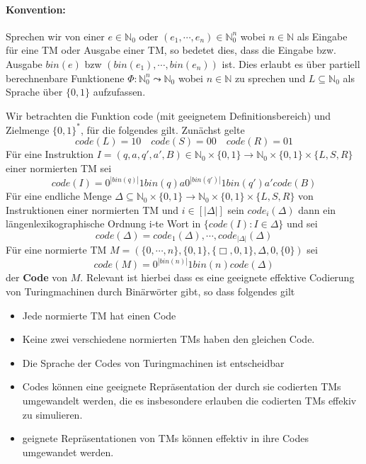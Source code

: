 \paragraph{Konvention: } Sprechen wir von einer \(e \in \mathbb{N}_0\) oder \((e_1, \cdots, e_n) \in \mathbb{N}_0^n\) wobei \(n \in \mathbb{N}\) als Eingabe für eine TM oder Ausgabe einer TM, so bedetet dies, dass die Eingabe bzw. Ausgabe \(bin(e)\) bzw \((bin(e_1), \cdots, bin(e_n))\) ist. Dies erlaubt es über partiell berechnenbare Funktionene \(\Phi: \mathbb{N}_0^n \leadsto \mathbb{N}_0\) wobei \(n\in \mathbb{N}\) zu sprechen und \(L \subseteq \mathbb{N}_0\) als Sprache über \(\{0, 1\}\) aufzufassen.

  Wir betrachten die Funktion code (mit geeignetem Definitionsbereich) und Zielmenge \(\{0, 1\}^*\), für die folgendes gilt. Zunächst gelte 
  \[
    code(L) = 10 \quad code (S) = 00 \quad code(R) = 01
  \]
  Für eine Instruktion \( I = (q, a, q', a', B) \in \mathbb{N}_0 \times \{0, 1\} \to \mathbb{N}_0 \times \{0, 1\} \times \{L, S, R\}\) einer normierten TM sei \[code (I) = 0^{|bin(q)|} 1 bin (q) a 0^{|bin(q')|} 1 bin (q') a' code (B)\] Für eine endliche Menge \( \Delta \subseteq \mathbb{N}_0 \times \{0, 1\} \to \mathbb{N}_0 \times \{0, 1\}\times \{L, S, R\}\) von Instruktionen einer normierten TM und \(i \in [|\Delta|]\) sein \(code_i(\Delta)\) dann ein längenlexikographische Ordnung i-te Wort in \(\{code(I): I \in \Delta\}\) und sei 
  \[
    code (\Delta) = code_1(\Delta), \cdots, code_{|\Delta|}(\Delta)
  \]
  Für eine normierte TM \(M = (\{0, \cdots, n\}, \{0, 1\}, \{\Box, 0, 1\}, \Delta, 0, \{0\})\) sei 
  \[
    code (M) = 0^{|bin(n)|} 1 bin (n) code (\Delta)
  \]
  der \textbf{Code} von \(M\). Relevant ist hierbei dass es eine geeignete effektive Codierung von Turingmachinen durch Binärwörter gibt, so dass folgendes gilt 
  \begin{itemize}
    \item Jede normierte TM hat einen Code 
    \item Keine zwei verschiedene normierten TMs haben den gleichen Code.
    \item Die Sprache der Codes von Turingmachinen ist entscheidbar
    \item Codes können eine geeignete Repräsentation der durch sie codierten TMs umgewandelt werden, die es insbesondere erlauben die codierten TMs effekiv zu simulieren.
    \item geignete Repräsentationen von TMs können effektiv in ihre Codes umgewandet werden.
  \end{itemize}

